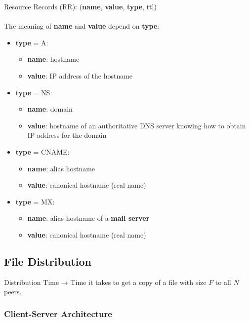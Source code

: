 \documentclass[12pt]{article}
\begin{document}
Resource Records (RR): (\textbf{name}, \textbf{value}, \textbf{type}, ttl) \\\\
The meaning of \textbf{name} and \textbf{value} depend on \textbf{type}:

\begin{itemize}[topsep=0pt, itemsep=0pt]
    \item \textbf{type} = A:
        \begin{itemize}[topsep=0pt, itemsep=0pt]
            \item \textbf{name}: hostname
            \item \textbf{value}: IP address of the hostname
        \end{itemize}
    \item \textbf{type} = NS:
        \begin{itemize}[topsep=0pt, itemsep=0pt]
            \item \textbf{name}: domain
            \item \textbf{value}: hostname of an authoritative DNS server knowing how to obtain IP address for the domain
        \end{itemize}
    \item \textbf{type} = CNAME:
        \begin{itemize}[topsep=0pt, itemsep=0pt]
            \item \textbf{name}: alias hostname
            \item \textbf{value}: canonical hostname (real name)
        \end{itemize}
    \item \textbf{type} = MX:
        \begin{itemize}[topsep=0pt, itemsep=0pt]
            \item \textbf{name}: alias hostname of a \textbf{mail server}
            \item \textbf{value}: canonical hostname (real name)
        \end{itemize}
\end{itemize}

\subsection{File Distribution}

Distribution Time → Time it takes to get a copy of a file with size $F$ to all $N$ peers.

\subsubsection{Client-Server Architecture}
\end{document}
